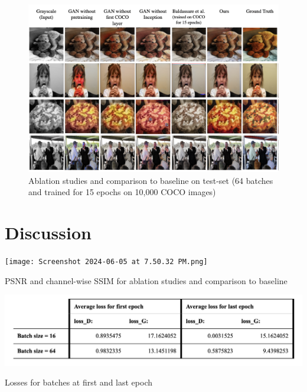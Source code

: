 \documentclass[10pt,twocolumn,letterpaper]{article}
\begin{document}
\begin{figure}
    \centering
    \includegraphics[width=1\linewidth]{latex/results_final.png}
    \caption{Ablation studies and comparison to baseline on test-set (64 batches and trained for 15 epochs on 10,000 COCO images)}
    \label{fig:enter-label}
\end{figure}
\section{Discussion}
\begin{table}
    \centering
    \texttt{[image: Screenshot 2024-06-05 at 7.50.32 PM.png]}
    \caption{PSNR and channel-wise SSIM for ablation studies and comparison to baseline}
    \label{fig:enter-label}
\end{table}
\begin{table}
    \centering
    \includegraphics[width=1\linewidth]{latex/loss for batches.png}
    \caption{Losses for batches at first and last epoch}
    \label{fig:enter-label}
\end{table}
\end{document}
